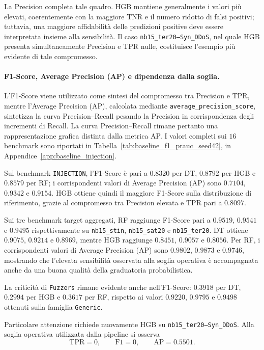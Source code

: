 La Precision completa tale quadro. 
HGB mantiene generalmente i valori più elevati, coerentemente con la maggiore TNR e il numero ridotto di falsi positivi; tuttavia, una maggiore affidabilità delle predizioni positive deve essere interpretata insieme alla sensibilità. 
Il caso \texttt{nb15\_ter20--Syn\_DDoS}, nel quale HGB presenta simultaneamente Precision e TPR nulle, costituisce l'esempio più evidente di tale compromesso.

\paragraph{F1-Score, Average Precision (AP) e dipendenza dalla soglia.}
L'F1-Score viene utilizzato come sintesi del compromesso tra Precision e TPR, mentre l'Average Precision (AP), calcolata mediante \texttt{average\_precision\_score}, sintetizza la curva Precision--Recall pesando la Precision in corrispondenza degli incrementi di Recall. La curva Precision--Recall rimane pertanto una rappresentazione grafica distinta dalla metrica AP. 
I valori completi sui $16$ benchmark sono riportati in Tabella~\ref{tab:baseline_f1_prauc_seed42}, in Appendice~\ref{app:baseline_injection}.

Sul benchmark \texttt{INJECTION}, l'F1-Score è pari a $0.8320$ per DT, $0.8792$ per HGB e $0.8579$ per RF; i corrispondenti valori di Average Precision (AP) sono $0.7104$, $0.9342$ e $0.9154$. 
HGB ottiene quindi il maggiore F1-Score sulla distribuzione di riferimento, grazie al compromesso tra Precision elevata e TPR pari a $0.8097$.

Sui tre benchmark target aggregati, RF raggiunge F1-Score pari a $0.9519$, $0.9541$ e $0.9495$ rispettivamente su \texttt{nb15\_stin}, \texttt{nb15\_sat20} e \texttt{nb15\_ter20}. 
DT ottiene $0.9075$, $0.9214$ e $0.8969$, mentre HGB raggiunge $0.8451$, $0.9057$ e $0.8056$. 
Per RF, i corrispondenti valori di Average Precision (AP) sono $0.9802$, $0.9873$ e $0.9746$, mostrando che l'elevata sensibilità osservata alla soglia operativa è accompagnata anche da una buona qualità della graduatoria probabilistica.

La criticità di \texttt{Fuzzers} rimane evidente anche nell'F1-Score: $0.3918$ per DT, $0.2994$ per HGB e $0.3617$ per RF, rispetto ai valori $0.9220$, $0.9795$ e $0.9498$ ottenuti sulla famiglia \texttt{Generic}.

Particolare attenzione richiede nuovamente HGB su \texttt{nb15\_ter20--Syn\_DDoS}. 
Alla soglia operativa utilizzata dalla pipeline si osserva
\[
    \mathrm{TPR}=0,
    \qquad
    \mathrm{F1}=0,
    \qquad
    \mathrm{AP}=0.5501.
\]

